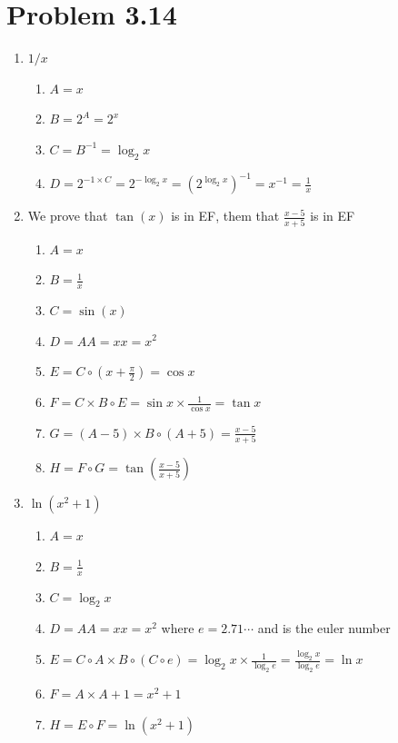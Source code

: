 \documentclass[12pt]{article}
\begin{document}
\section*{Problem 3.14}
\begin{enumerate}[label=\alph*)]
    \item $1/x$
    \begin{enumerate}[label=\arabic*.]
        \item $A=x$
        \item $B=2^A=2^x$
        \item $C=B^{-1}=\log_2{x}$
        \item $D=2^{-1\times C} = 2^{-\log_{2}{x}}=\left(2^{\log_2{x}}\right)^{-1}=x^{-1}=\frac{1}{x}$
    \end{enumerate}
    \item We prove that $\tan(x)$ is in EF, them that $\frac{x-5}{x+5}$ is in EF 
    \begin{enumerate}[label=\arabic*.]
        \item $A=x$
        \item $B=\frac{1}{x}$
        \item $C=\sin(x)$
        \item $D=AA=xx=x^2$
        \item $E=C\circ\left(x+\frac{\pi}{2}\right)=\cos{x}$
        \item $F=C \times B \circ E = \sin{x}\times\frac{1}{\cos{x}}=\tan{x}$
        \item $G=(A-5) \times B \circ (A+5)=\frac{x-5}{x+5}$
        \item $H=F \circ G = \tan {\left(\frac{x-5}{x+5}\right)}$
    \end{enumerate}
    \item $\ln{\left(x^2+1\right)}$
    \begin{enumerate}[label=\arabic*.]
        \item $A=x$
        \item $B=\frac{1}{x}$
        \item $C=\log_2{x}$
        \item $D=AA=xx=x^2$ where $e=2.71\cdots$ and is the euler number
        \item $E=C\circ A \times B\circ (C\circ e)=\log_2{x}\times \frac{1}{\log_2{e}}=\frac{\log_2{x}}{\log_2{e}}=\ln{x}$
        \item $F=A\times A + 1 = x^2 + 1$
        \item $H=E \circ F = \ln{\left(x^2+1\right)}$
    \end{enumerate}

\end{enumerate}
\end{document}
